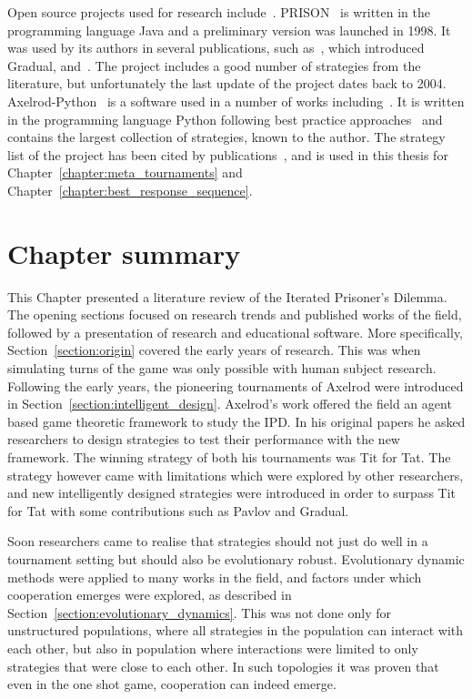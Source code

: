 Open source projects used for research include~\cite{prison, axelrodproject}.
PRISON~\cite{prison} is written in the programming language Java and a
preliminary version was launched in 1998. It was used by its authors in several
publications, such as~\cite{Beaufils1997}, which introduced Gradual,
and~\cite{Beaufils1988}. The project includes a good number of strategies from
the literature, but unfortunately the last update of the project dates back to
2004. Axelrod-Python~\cite{axelrodproject} is a software used
in a number of works including~\cite{Knight2017,KnightHGC17, Goodman2018, Wang2017}. 
It is written in the
programming language Python following best practice
approaches~\cite{Aberdour2007, Benureau2018} and contains the largest collection
of strategies, known to the author. The strategy list of the project has been
cited by publications~\cite{Anastassacos2018, Hayes2017, Neumann2018}, and is
used in this thesis for Chapter~\ref{chapter:meta_tournaments} and
Chapter~\ref{chapter:best_response_sequence}.

\section{Chapter summary}

This Chapter presented a literature review of the Iterated Prisoner's
Dilemma. The opening sections focused on research trends and published works of
the field, followed by a presentation of research and educational software.
More specifically, Section~\ref{section:origin}
covered the early years of research. This was when simulating turns of the game
was only possible with human subject research.
Following the early years, the pioneering tournaments of Axelrod were introduced in
Section~\ref{section:intelligent_design}. Axelrod's work offered the field an
agent based game theoretic framework to study the IPD.
In his original papers he asked researchers to design strategies to test their
performance with the new framework. The winning strategy of both his tournaments
was Tit for Tat. The strategy however came with limitations which were explored
by other researchers, and new intelligently designed strategies were introduced in
order to surpass Tit for Tat with some contributions such as Pavlov and Gradual.

Soon researchers came to realise that strategies should not just do well in a tournament setting
but should also be evolutionary robust. Evolutionary dynamic methods were
applied to many works in the field, and factors under which cooperation
emerges were explored, as described in Section~\ref{section:evolutionary_dynamics}.
This was not done only for unstructured populations, where all strategies
in the population can interact with each other, but also in population where
interactions were limited to only strategies that were close to each other.
In such topologies it was proven that even in the one shot game, cooperation can
indeed emerge.

